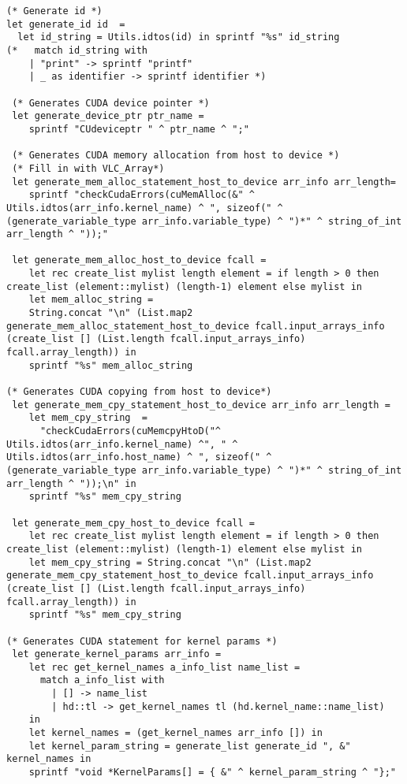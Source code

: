 \begin{verbatim}
(* Generate id *)
let generate_id id  = 
  let id_string = Utils.idtos(id) in sprintf "%s" id_string
(*   match id_string with
    | "print" -> sprintf "printf"
    | _ as identifier -> sprintf identifier *)

 (* Generates CUDA device pointer *)
 let generate_device_ptr ptr_name = 
    sprintf "CUdeviceptr " ^ ptr_name ^ ";"

 (* Generates CUDA memory allocation from host to device *)
 (* Fill in with VLC_Array*) 
 let generate_mem_alloc_statement_host_to_device arr_info arr_length= 
    sprintf "checkCudaErrors(cuMemAlloc(&" ^ Utils.idtos(arr_info.kernel_name) ^ ", sizeof(" ^ (generate_variable_type arr_info.variable_type) ^ ")*" ^ string_of_int arr_length ^ "));"

 let generate_mem_alloc_host_to_device fcall = 
    let rec create_list mylist length element = if length > 0 then create_list (element::mylist) (length-1) element else mylist in
    let mem_alloc_string = 
    String.concat "\n" (List.map2 generate_mem_alloc_statement_host_to_device fcall.input_arrays_info (create_list [] (List.length fcall.input_arrays_info) fcall.array_length)) in
    sprintf "%s" mem_alloc_string

(* Generates CUDA copying from host to device*)
 let generate_mem_cpy_statement_host_to_device arr_info arr_length = 
    let mem_cpy_string  = 
      "checkCudaErrors(cuMemcpyHtoD("^ Utils.idtos(arr_info.kernel_name) ^", " ^ Utils.idtos(arr_info.host_name) ^ ", sizeof(" ^ (generate_variable_type arr_info.variable_type) ^ ")*" ^ string_of_int arr_length ^ "));\n" in
    sprintf "%s" mem_cpy_string

 let generate_mem_cpy_host_to_device fcall = 
    let rec create_list mylist length element = if length > 0 then create_list (element::mylist) (length-1) element else mylist in
    let mem_cpy_string = String.concat "\n" (List.map2 generate_mem_cpy_statement_host_to_device fcall.input_arrays_info (create_list [] (List.length fcall.input_arrays_info) fcall.array_length)) in
    sprintf "%s" mem_cpy_string

(* Generates CUDA statement for kernel params *)
 let generate_kernel_params arr_info = 
    let rec get_kernel_names a_info_list name_list = 
      match a_info_list with 
        | [] -> name_list 
        | hd::tl -> get_kernel_names tl (hd.kernel_name::name_list) 
    in
    let kernel_names = (get_kernel_names arr_info []) in 
    let kernel_param_string = generate_list generate_id ", &" kernel_names in 
    sprintf "void *KernelParams[] = { &" ^ kernel_param_string ^ "};"


\end{verbatim}
